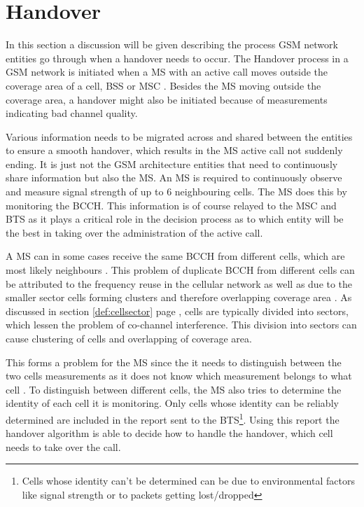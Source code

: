 \section{Handover}
\label{sec:handover}
In this section a discussion will be given describing the process GSM network entities go through when a handover needs to occur. The Handover process in a GSM network is initiated when a MS with an active call moves outside the coverage area of a cell, BSS or MSC \cite{GSMArchitectureProtocolsServices,wirelesstelcoMullet,Eisenblatter}. Besides the MS moving outside the coverage area, a handover might also be initiated because of measurements indicating bad channel quality\cite{GSMArchitectureProtocolsServices}. 

Various information needs to be migrated across and shared between the entities to ensure a smooth handover, which results in the MS active call not suddenly ending. It is just not the GSM architecture entities that need to continuously share information but also the MS. An MS is required to continuously observe and measure signal strength of up to 6 neighbouring cells. The MS does this by monitoring the BCCH\cite{GSMArchitectureProtocolsServices,wirelesstelcoMullet}. This information is of course relayed to the MSC and BTS as it plays a critical role in the decision process as to which entity will be the best in taking over the administration of the active call\cite{GSMArchitectureProtocolsServices,wirelesstelcoMullet}.

A MS can in some cases receive the same BCCH from different cells, which are most likely neighbours \cite{GSMArchitectureProtocolsServices}. This problem of duplicate BCCH from different cells can be attributed to the frequency reuse in the cellular network as well as due to the smaller sector cells forming clusters and therefore overlapping coverage area \cite{GSMArchitectureProtocolsServices}. As discussed in section \ref{def:cellsector} page \pageref{def:cellsector}, cells are typically divided into sectors, which lessen the problem of co-channel interference. This division into sectors can cause clustering of cells and overlapping of coverage area.

This forms a problem for the MS since the it needs to distinguish between the two cells measurements as it does not know which measurement belongs to what cell \cite{GSMArchitectureProtocolsServices}. To distinguish between different cells, the MS also tries to determine the identity of each cell it is monitoring. Only cells whose identity can be reliably determined are included in the report sent to the BTS\cite{Eisenblatter,GSMArchitectureProtocolsServices,wirelesstelcoMullet}\footnote{Cells whose identity can't be determined can be due to environmental factors like signal strength or to packets getting lost/dropped}. Using this report the handover algorithm is able to decide how to handle the handover, which cell needs to take over the call\cite{Eisenblatter,GSMArchitectureProtocolsServices,wirelesstelcoMullet}.

